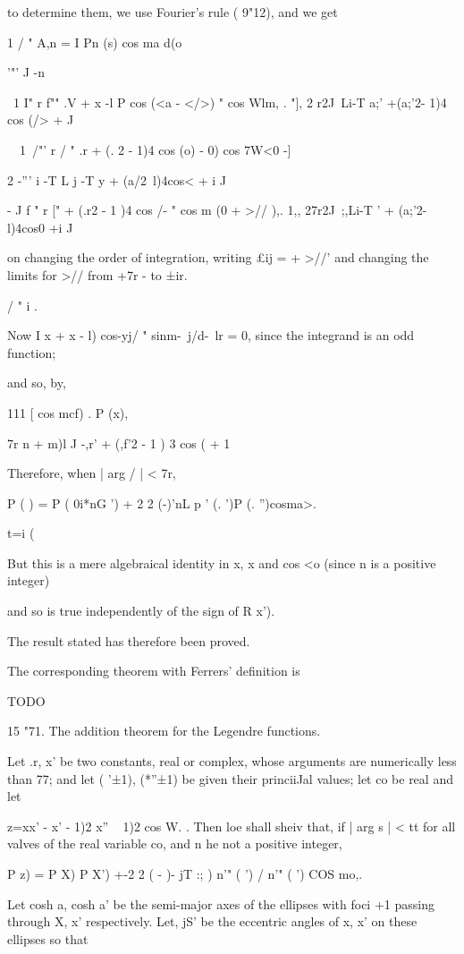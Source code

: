 {{{to determine them, we use Fourier's rule ( 9"12), and we get

1 / " A,n = I Pn (s) cos ma d(o

'"' J -n

\ 1 I" r f"" .V + x -l P cos (<a - </>) " cos Wlm, . "], 2 r2J\ Li-T
a;' +(a;'2- 1)4 cos (/> + J

\ \ 1\ /"' r / " .r + (. 2 - 1)4 cos (o) - 0) cos 7W<0 -]

2 -''' i -T L j -T y + (a/2\ l)4cos< + i J

- J f " r [" + (.r2 - 1 )4 cos /- " cos m (0 + >// ),. 1,, 27r2J\
;,Li-T ' + (a;'2-l)4cos0 +i J

on changing the order of integration, writing £ij = + >//' and
changing the limits for >// from +7r - to ±ir.

%
%

/ " i .

Now I x + x - l) cos-yj/ " sinm-\ j/d-\ lr = 0, since the integrand is
an odd function;

and so, by,

111 [ cos mcf) . P (x),

7r n + m)l J -,r' + (,f'2 - 1 ) 3 cos ( + 1

Therefore, when | arg / | < 7r,

P ( ) = P ( 0i*nG ') + 2 2 (-)'nL p ' (. ')P (. '')cosma>.

 t=i (%

But this is a mere algebraical identity in x, x and cos <o (since n is
a positive integer)

and so is true independently of the sign of R x').

The result stated has therefore been proved.

The corresponding theorem with Ferrers' definition is

TODO

15 "71. The addition theorem for the Legendre functions.

Let .r, x' be two constants, real or complex, whose arguments are
numerically less than 77; and let ( '±1), (*''±1) be given their
princiiJal values; let co be real and let

z=xx' - x' - 1)2 x'' ~ 1)2 cos W. . Then loe shall sheiv that, if |
arg s | < tt for all valves of the real variable co, and n he not a
positive integer,

P z) = P X) P X') +-2 2 ( - )- jT :; ) n'" ( ') / n'" ( ') COS mo,.

Let cosh a, cosh a' be the semi-major axes of the ellipses with foci
+1 passing through X, x' respectively. Let, jS' be the eccentric
angles of x, x' on these ellipses so that

}}}
